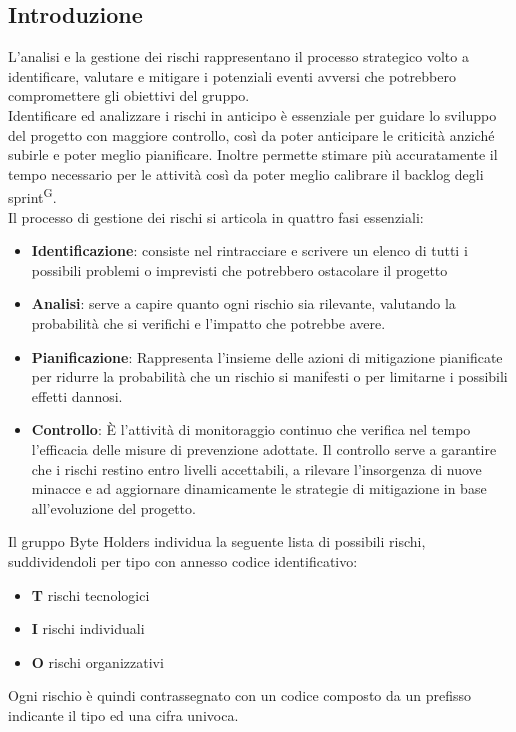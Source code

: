 \documentclass[a4paper, 11pt]{article}
\begin{document}
\subsection{Introduzione}
L'analisi e la gestione dei rischi rappresentano il processo strategico volto a identificare, valutare e mitigare i potenziali eventi avversi che potrebbero compromettere gli obiettivi del gruppo. \\[0.4cm]
Identificare ed analizzare i rischi in anticipo è essenziale per guidare lo sviluppo del progetto con maggiore controllo, così da poter anticipare le criticità anziché subirle e poter meglio pianificare. Inoltre permette stimare più accuratamente il tempo necessario per le attività così da poter meglio calibrare il backlog degli sprint\textsuperscript{G}. \\[0.4cm]
Il processo di gestione dei rischi si articola in quattro fasi essenziali:
\begin{itemize}
  \item \textbf{Identificazione}: consiste nel rintracciare e scrivere un elenco di tutti i possibili problemi o imprevisti che potrebbero ostacolare il progetto
  \item \textbf{Analisi}: serve a capire quanto ogni rischio sia rilevante, valutando la probabilità che si verifichi e l'impatto che potrebbe avere.
  \item \textbf{Pianificazione}: Rappresenta l’insieme delle azioni di mitigazione pianificate per ridurre la probabilità che un rischio si manifesti o per limitarne i possibili effetti dannosi.
  \item \textbf{Controllo}: È l’attività di monitoraggio continuo che verifica nel tempo l'efficacia delle misure di prevenzione adottate. Il controllo serve a garantire che i rischi restino entro livelli accettabili, a rilevare l'insorgenza di nuove minacce e ad aggiornare dinamicamente le strategie di mitigazione in base all'evoluzione del progetto.
\end{itemize}
\vspace{0.4cm}
Il gruppo Byte Holders individua la seguente lista di possibili rischi, suddividendoli per tipo con annesso codice identificativo:
\begin{itemize}
  \item \textbf{T} rischi tecnologici
  \item \textbf{I} rischi individuali
  \item \textbf{O} rischi organizzativi
\end{itemize}
\vspace{0.4cm}
Ogni rischio è quindi contrassegnato con un codice composto da un prefisso indicante il tipo ed una cifra univoca.
\end{document}
